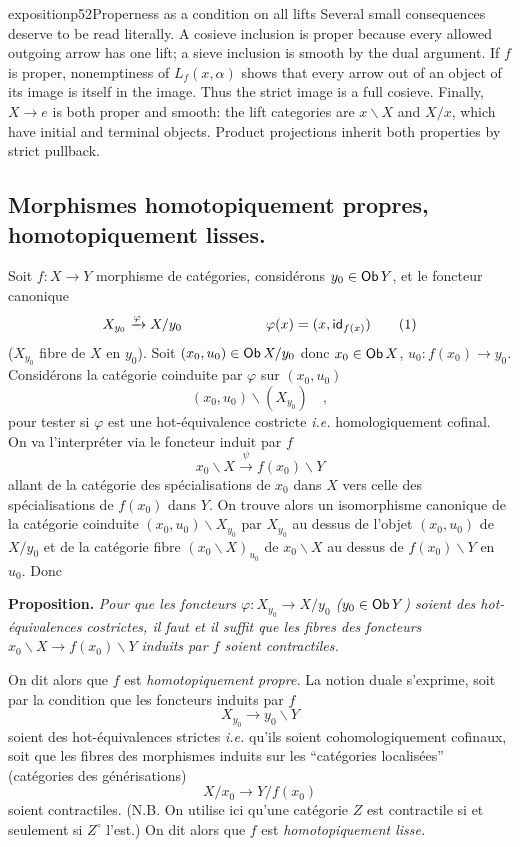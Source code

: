 \begin{dcomment}{exposition}{p52}{Properness as a condition on all lifts}
Several small consequences deserve to be read literally. A cosieve inclusion is proper because every allowed outgoing arrow has one lift; a sieve inclusion is smooth by the dual argument. If $f$ is proper, nonemptiness of $L_f(x,\alpha)$ shows that every arrow out of an object of its image is itself in the image. Thus the strict image is a full cosieve. Finally, $X\to e$ is both proper and smooth: the lift categories are $x\backslash X$ and $X/x$, which have initial and terminal objects. Product projections inherit both properties by strict pullback.
\end{dcomment}


\subsection*{Morphismes homotopiquement propres, homotopiquement lisses.}

\noindent Soit $f : X \to Y$ morphisme de catégories, considérons $y_0 \in \mathsf{Ob}\, Y$, et le foncteur canonique
\[
X_{y_0} \xrightarrow{\varphi} X/y_0 \qquad\qquad\qquad \varphi(x) = (x, \mathsf{id}_{f(x)}) \tag*{(1)}
\]
($X_{y_0}$ fibre de $X$ en $y_0$). Soit $(x_0, u_0) \in \mathsf{Ob}\, X/y_0$ donc $x_0 \in \mathsf{Ob}\, X$, $u_0 : f(x_0) \to y_0$. Considérons la catégorie coinduite par $\varphi$ sur $(x_0, u_0)$
\[
(x_0, u_0)\backslash(X_{y_0}) \quad ,
\]
pour tester si $\varphi$ est une hot-équivalence costricte \textit{i.e.} homologiquement cofinal. On va l'interpréter via le foncteur induit par $f$
\[
x_0\backslash X \xrightarrow{\psi} f(x_0)\backslash Y
\]
allant de la catégorie des spécialisations de $x_0$ dans $X$ vers celle des spécialisations de $f(x_0)$ dans $Y$. On trouve alors un isomorphisme canonique de la catégorie coinduite $(x_0, u_0)\backslash X_{y_0}$ par $X_{y_0}$ au dessus de l'objet $(x_0, u_0)$ de $X/y_0$ et de la catégorie fibre $(x_0\backslash X)_{u_0}$ de $x_0\backslash X$ au dessus de $f(x_0)\backslash Y$ en $u_0$. Donc

\noindent\textbf{Proposition.} \textit{Pour que les foncteurs $\varphi : X_{y_0} \to X/y_0$ ($y_0 \in \mathsf{Ob}\, Y$) soient des hot-équivalences costrictes, il faut et il suffit que les fibres des foncteurs $x_0\backslash X \to f(x_0)\backslash Y$ induits par $f$ soient contractiles.}

\noindent{}
On dit alors que $f$ est \textit{homotopiquement propre.} La notion duale s'exprime, soit par la condition que les foncteurs induits par $f$
\[
X_{y_0} \longrightarrow y_0\backslash Y
\]
soient des hot-équivalences strictes \textit{i.e.} qu'ils soient cohomologiquement cofinaux, soit que les fibres des morphismes induits sur les ``catégories localisées'' (catégories des générisations)
\[
X/x_0 \longrightarrow Y/f(x_0)
\]
soient contractiles. (N.B. On utilise ici qu'une catégorie $Z$ est contractile si et seulement si $Z^\circ$ l'est.) On dit alors que $f$ est \textit{homotopiquement lisse.}

